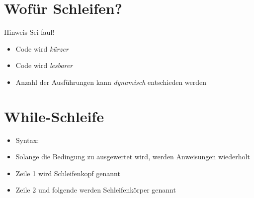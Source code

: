 



\subtitle{Schleifen}
\maketitle

\tocslide

\section{Wofür Schleifen?}
\begin{frame}
	\slidehead

\end{frame}

\begin{frame}
	\slidehead

	\pause
	\begin{block}{Hinweis}
		Sei faul!
	\end{block}
\end{frame}

\begin{frame}
	\slidehead

	\begin{itemize}
		\item Code wird \textit{kürzer}
		\item Code wird \textit{lesbarer}
		\item Anzahl der Ausführungen kann \textit{dynamisch} entschieden werden
	\end{itemize}
\end{frame}

\section{While-Schleife}
\begin{frame}
	\slidehead

	\begin{itemize}
		 \item Syntax:
		 \item Solange die Bedingung zu  ausgewertet wird, werden Anweisungen wiederholt
		 \item Zeile 1 wird Schleifenkopf genannt
		 \item Zeile 2 und folgende werden Schleifenkörper genannt
	\end{itemize}
\end{frame}

